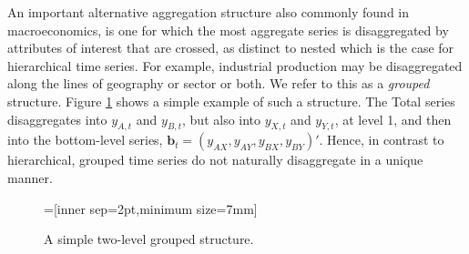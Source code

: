 \documentclass[graybox]{svmult}
\begin{document}
An important alternative aggregation structure also commonly found in macroeconomics, is one for which the most aggregate series is disaggregated by attributes of interest that are crossed, as distinct to nested which is the case for hierarchical time series. For example, industrial production may be disaggregated along the lines of geography or sector or both. We refer to this as a \textit{grouped} structure. Figure \ref{fig:simple grouped tree} shows a simple example of such a structure. The Total series disaggregates into $y_{A,t}$ and $y_{B,t}$, but also into $y_{X,t}$ and $y_{Y,t}$, at level 1, and then into the bottom-level series, $\bm{b}_t=(y_{AX}, y_{AY}, y_{BX}, y_{BY})'$. Hence, in contrast to hierarchical, grouped time series do not naturally disaggregate in a unique manner.
\begin{figure}[!hbt]
\center
{}=[inner sep=2pt,minimum size=7mm]
  \caption{A simple two-level grouped structure.}
  \label{fig:simple grouped tree}
\end{figure}
\end{document}
